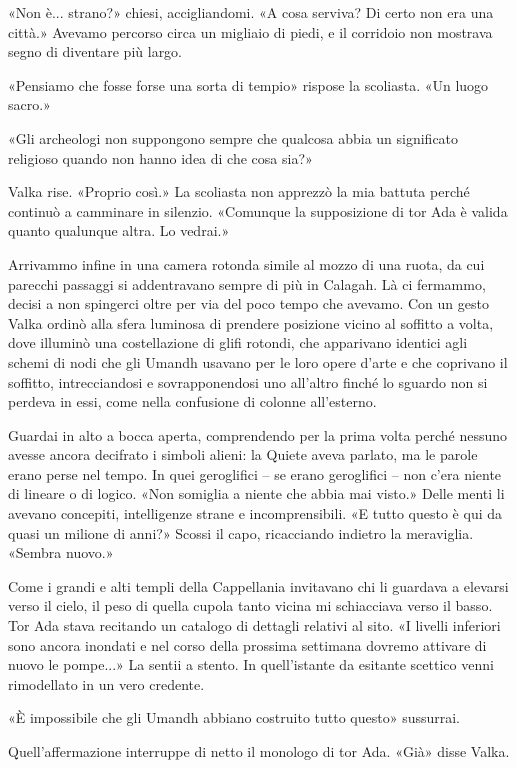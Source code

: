 «Non è... strano?» chiesi, accigliandomi. «A cosa serviva? Di certo non
era una città.» Avevamo percorso circa un migliaio di piedi, e il
corridoio non mostrava segno di diventare più largo.

«Pensiamo che fosse forse una sorta di tempio» rispose la scoliasta. «Un
luogo sacro.»

«Gli archeologi non suppongono sempre che qualcosa abbia un significato
religioso quando non hanno idea di che cosa sia?»

Valka rise. «Proprio così.» La scoliasta non apprezzò la mia battuta
perché continuò a camminare in silenzio. «Comunque la supposizione di
tor Ada è valida quanto qualunque altra. Lo vedrai.»

Arrivammo infine in una camera rotonda simile al mozzo di una ruota, da
cui parecchi passaggi si addentravano sempre di più in Calagah. Là ci
fermammo, decisi a non spingerci oltre per via del poco tempo che
avevamo. Con un gesto Valka ordinò alla sfera luminosa di prendere
posizione vicino al soffitto a volta, dove illuminò una costellazione di
glifi rotondi, che apparivano identici agli schemi di nodi che gli
Umandh usavano per le loro opere d'arte e che coprivano il soffitto,
intrecciandosi e sovrapponendosi uno all'altro finché lo sguardo non si
perdeva in essi, come nella confusione di colonne all'esterno.

Guardai in alto a bocca aperta, comprendendo per la prima volta perché
nessuno avesse ancora decifrato i simboli alieni: la Quiete aveva
parlato, ma le parole erano perse nel tempo. In quei geroglifici -- se
erano geroglifici -- non c'era niente di lineare o di logico. «Non
somiglia a niente che abbia mai visto.» Delle menti li avevano
concepiti, intelligenze strane e incomprensibili. «E tutto questo è qui
da quasi un milione di anni?» Scossi il capo, ricacciando indietro la
meraviglia. «Sembra nuovo.»

Come i grandi e alti templi della Cappellania invitavano chi li guardava
a elevarsi verso il cielo, il peso di quella cupola tanto vicina mi
schiacciava verso il basso. Tor Ada stava recitando un catalogo di
dettagli relativi al sito. «I livelli inferiori sono ancora inondati e
nel corso della prossima settimana dovremo attivare di nuovo le
pompe...» La sentii a stento. In quell'istante da esitante scettico
venni rimodellato in un vero credente.

«È impossibile che gli Umandh abbiano costruito tutto questo» sussurrai.

Quell'affermazione interruppe di netto il monologo di tor Ada. «Già»
disse Valka.


